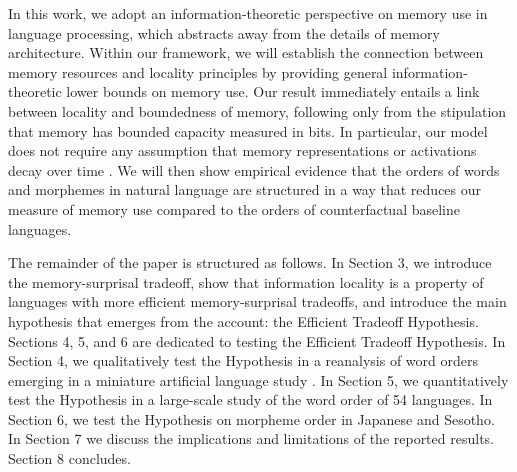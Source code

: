 In this work, we adopt an information-theoretic perspective on memory use in language processing, which abstracts away from the details of memory architecture. 
Within our framework, we will establish the connection between memory resources and locality principles by providing general information-theoretic lower bounds on memory use.
Our result immediately entails a link between locality and boundedness of memory, following only from the stipulation that memory has bounded capacity measured in bits. 
In particular, our model does not require any assumption that memory representations or activations decay over time \citep[as was required in][]{gibson1998linguistic, lewis-activation-based-2005, futrell2020lossy}.
We will then show empirical evidence that the orders of words and morphemes in natural language are structured in a way that reduces our measure of memory use compared to the orders of counterfactual baseline languages.

The remainder of the paper is structured as follows. In Section 3, we introduce the memory-surprisal tradeoff, show that information locality is a property of languages with more efficient memory-surprisal tradeoffs, and introduce the main hypothesis that emerges from the account: the Efficient Tradeoff Hypothesis. Sections 4, 5, and 6 are dedicated to testing the Efficient Tradeoff Hypothesis. In Section 4, we qualitatively test the Hypothesis in a reanalysis of word orders emerging in a miniature artificial language study \citep{fedzechkina-human-2017}.
In Section 5, we quantitatively test the Hypothesis in a large-scale study of the word order of 54 languages. In Section 6, we test the Hypothesis on morpheme order in Japanese and Sesotho.
In Section 7 we discuss the implications and limitations of the reported results.
Section 8 concludes.



